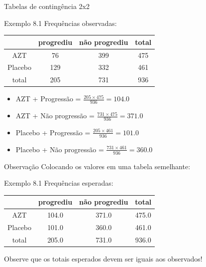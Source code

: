 \documentclass{beamer}
\begin{document}
\begin{frame}{\scriptsize Tabelas de contingência 2x2}
  \begin{exampleblock}{Exemplo 8.1}
    \footnotesize
    Frequências observadas:
    \begin{tabular}{c|c|c|c}
      & progrediu & não progrediu & total\\
      \hline
      AZT & 76 & 399 & 475\\
      \hline
      Placebo & 129 & 332 & 461\\
      \hline
      total & 205 & 731 & 936\\
    \end{tabular}
  \end{exampleblock}
  \vfill
  \begin{itemize}
    \scriptsize
  \item AZT + Progressão = $\frac{205 \times 475}{936} = 104.0$
  \item AZT + Não progressão = $\frac{731 \times 475}{936} = 371.0$
  \item Placebo + Progressão = $\frac{205 \times 461}{936} = 101.0$
  \item Placebo + Não progressão = $\frac{731 \times 461}{936} = 360.0$
  \end{itemize}
\end{frame}

\begin{frame}{\scriptsize Observação}
Colocando os valores em uma tabela semelhante:
  \begin{exampleblock}{Exemplo 8.1}
    \footnotesize
    Frequências esperadas:
    \begin{tabular}{c|c|c|c}
      & progrediu & não progrediu & total\\
      \hline
      AZT & 104.0 & 371.0 & 475.0\\
      \hline
      Placebo & 101.0 & 360.0 & 461.0\\
      \hline
      total & 205.0 & 731.0 & 936.0\\
    \end{tabular}
  \end{exampleblock}
  \vfill
  \small
Observe que os totais esperados devem ser iguais aos observados!
\end{frame}
\end{document}
